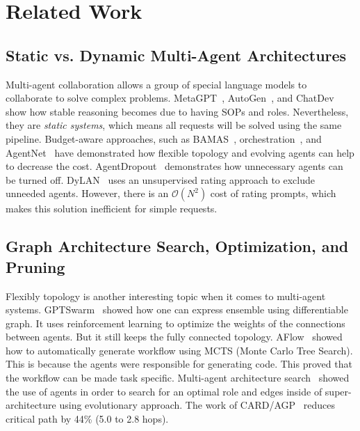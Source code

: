 \documentclass[conference]{IEEEtran}
\begin{document}
\section{Related Work}

\label{sec:related_work}

\subsection{Static vs. Dynamic Multi-Agent Architectures}

Multi-agent collaboration allows a group of special language models to collaborate to solve complex problems. MetaGPT~\cite{hong2024metagpt}, AutoGen~\cite{wu2023autogen}, and ChatDev~\cite{qian2024chatdev} show how stable reasoning becomes due to having SOPs and roles. Nevertheless, they are \textit{static systems}, which means all requests will be solved using the same pipeline. Budget-aware approaches, such as BAMAS~\cite{Yang2026BAMAS}, orchestration~\cite{dang2025multiagent}, and AgentNet~\cite{yang2025agentnet} have demonstrated how flexible topology and evolving agents can help to decrease the cost. AgentDropout~\cite{xiao2026agentdropout} demonstrates how unnecessary agents can be turned off. DyLAN~\cite{liu2024dylan} uses an unsupervised rating approach to exclude unneeded agents. However, there is an $\mathcal{O}(N^2)$ cost of rating prompts, which makes this solution inefficient for simple requests.

\subsection{Graph Architecture Search, Optimization, and Pruning}

Flexibly topology is another interesting topic when it comes to multi-agent systems. GPTSwarm~\cite{zhuge2024gptswarm} showed how one can express ensemble using differentiable graph. It uses reinforcement learning to optimize the weights of the connections between agents. But it still keeps the fully connected topology. AFlow~\cite{zhang2024aflow} showed how to automatically generate workflow using MCTS (Monte Carlo Tree Search). This is because the agents were responsible for generating code. This proved that the workflow can be made task specific. Multi-agent architecture search~\cite{Zhang2025MaAS} showed the use of agents in order to search for an optimal role and edges inside of super-architecture using evolutionary approach. The work of CARD/AGP~\cite{Li2025AdaptiveGraphPruning} reduces critical path by 44\% (5.0 to 2.8 hops).
\end{document}
